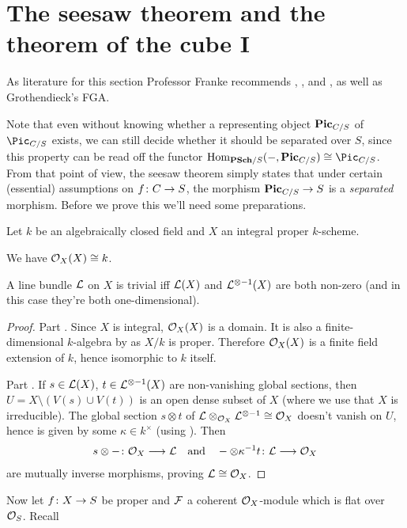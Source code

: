 \documentclass[a4paper,parskip=half,numbers=enddot, DIV=12]{scrreprt}
\begin{document}
\section{The seesaw theorem and the theorem of the cube I}
As literature for this section Professor Franke recommends \cite{mumford1974abelian}, \cite{cornell1986arithmetic}, and \cite{kleiman}, as well as Grothendieck's FGA.

Note that even without knowing whether a representing object $\mathbf{Pic}_{C/S}$ of $\Pic_{C/S}$ exists, we can still decide whether it should be separated over $S$, since this property can be read off the functor $\Hom_{\cat{PSch}/S}(-,\PIC_{C/S})\cong\Pic_{C/S}$. From that point of view, the seesaw theorem simply states that under certain (essential) assumptions on $f\colon C\morphism S$, the morphism $\PIC_{C/S}\morphism S$ is a \emph{separated} morphism. Before we prove this we'll need some preparations.
\begin{prop}
	Let $k$ be an algebraically closed field and $X$ an integral proper $k$-scheme.
	\begin{alphanumerate}
		\item We have $\mathcal{O}_X(X)\cong k$.
		\item A line bundle $\mathcal{L}$ on $X$ is trivial iff $\mathcal{L}(X)$ and $\mathcal{L}^{\otimes -1}(X)$ are both non-zero (and in this case they're both one-dimensional).
	\end{alphanumerate}
\end{prop}
\begin{proof}
	Part . Since $X$ is integral, $\mathcal{O}_X(X)$ is a domain. It is also a finite-dimensional $k$-algebra by \cite[Theorem~5]{alggeo2} as $X/k$ is proper. Therefore $\mathcal{O}_X(X)$ is a finite field extension of $k$, hence isomorphic to $k$ itself.
	
	Part . If $s\in\mathcal{L}(X)$, $t\in\mathcal{L}^{\otimes -1}(X)$ are non-vanishing global sections, then $U=X\setminus(V(s)\cup V(t))$ is an open dense subset of $X$ (where we use that $X$ is irreducible). The global section $s\otimes t$ of $\mathcal{L}\otimes_{\mathcal{O}_X}\mathcal{L}^{\otimes -1}\cong \mathcal{O}_X$ doesn't vanish on $U$, hence is given by some $\kappa\in k^\times$ (using ). Then
	\begin{align*}
		s\otimes-\colon \Oo_X\morphism \Ll\quad\text{and}\quad-\otimes\kappa^{-1}t\colon \Ll\morphism\Oo_X
	\end{align*}
	are mutually inverse morphisms, proving $\mathcal{L}\cong \mathcal{O}_X$.
\end{proof}
Now let $f\colon X\morphism S$ be proper and $\mathcal{F}$ a coherent $\mathcal{O}_X$-module which is flat over $\mathcal{O}_S$. Recall
\end{document}
